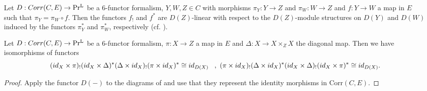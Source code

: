 \begin{remark}\label{* and ! linearity}
    Let  $D : Corr(C,E) \to \operatorname{Pr^{L}}$ be a $6$-functor formalism, $Y,W, Z\in C$ with morphisms $\pi_Y: Y \to Z$ and $\pi_W: W \to Z$ and  $f: Y \to W$ a map in $E$ such that $\pi_Y =\pi_W \circ f$. Then the functors $f_!$ and $f^*$ are $D(Z)$-linear with respect to the $D(Z)$-module structures on $D(Y)$ and $D(W)$ induced by the functors $\pi_Y^*$ and $\pi_W^*$, respectively (cf. \Cite[Lecture 3, Remark 3.13]{6functors}).
\end{remark}

\begin{corollary}\label{D(complicated) equals id}
Let  $D : Corr(C,E) \to \operatorname{Pr^{L}}$ be a $6$-functor formalism, $\pi : X \to Z$ a map in $E$ and $\Delta : X \to X\times_Z X$ the diagonal map. Then we have isomorphisms of functors
\[
(id_X \times \pi)_!(id_X \times \Delta)^*(\Delta \times id_X)_!(\pi \times id_X)^* \cong id_{D(X)} \hspace{3mm}, \
(\pi \times id_X)_!(\Delta \times id_X)^*(id_X \times \Delta)_!(id_X \times \pi)^* \cong id_{D(X)}.
\]

\end{corollary}
\begin{proof}
Apply the functor $D(-)$ to the diagrams of  and use that they represent the identity morphisms in $\mathrm{Corr}(C,E)$.
\end{proof}

